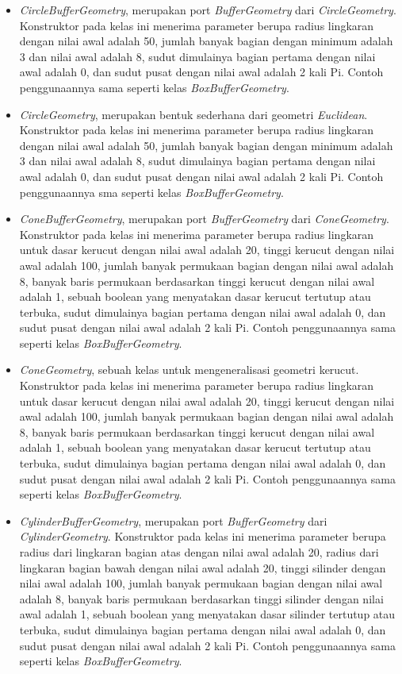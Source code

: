 \begin{itemize}
\begin{itemize}
	\item {\it CircleBufferGeometry}, merupakan port {\it BufferGeometry} dari {\it CircleGeometry}. Konstruktor pada kelas ini menerima parameter berupa radius lingkaran dengan nilai awal adalah 50, jumlah banyak bagian dengan minimum adalah 3 dan nilai awal adalah 8, sudut dimulainya bagian pertama dengan nilai awal adalah 0, dan sudut pusat dengan nilai awal adalah 2 kali Pi. Contoh penggunaannya sama seperti kelas {\it BoxBufferGeometry}.

	\item {\it CircleGeometry}, merupakan bentuk sederhana dari geometri {\it Euclidean}. Konstruktor pada kelas ini menerima parameter berupa radius lingkaran dengan nilai awal adalah 50, jumlah banyak bagian dengan minimum adalah 3 dan nilai awal adalah 8, sudut dimulainya bagian pertama dengan nilai awal adalah 0, dan sudut pusat dengan nilai awal adalah 2 kali Pi. Contoh penggunaannya sma seperti kelas {\it BoxBufferGeometry}.
	
	\item {\it ConeBufferGeometry}, merupakan port {\it BufferGeometry} dari {\it ConeGeometry}. Konstruktor pada kelas ini menerima parameter berupa radius lingkaran untuk dasar kerucut dengan nilai awal adalah 20, tinggi kerucut dengan nilai awal adalah 100, jumlah banyak permukaan bagian dengan nilai awal adalah 8, banyak baris permukaan berdasarkan tinggi kerucut dengan nilai awal adalah 1, sebuah boolean yang menyatakan dasar kerucut tertutup atau terbuka, sudut dimulainya bagian pertama dengan nilai awal adalah 0, dan sudut pusat dengan nilai awal adalah 2 kali Pi. Contoh penggunaannya sama seperti kelas {\it BoxBufferGeometry}.
	
	\item {\it ConeGeometry}, sebuah kelas untuk mengeneralisasi geometri kerucut. Konstruktor pada kelas ini menerima parameter berupa radius lingkaran untuk dasar kerucut dengan nilai awal adalah 20, tinggi kerucut dengan nilai awal adalah 100, jumlah banyak permukaan bagian dengan nilai awal adalah 8, banyak baris permukaan berdasarkan tinggi kerucut dengan nilai awal adalah 1, sebuah boolean yang menyatakan dasar kerucut tertutup atau terbuka, sudut dimulainya bagian pertama dengan nilai awal adalah 0, dan sudut pusat dengan nilai awal adalah 2 kali Pi. Contoh penggunaannya sama seperti kelas {\it BoxBufferGeometry}.
	
	\item {\it CylinderBufferGeometry}, merupakan port {\it BufferGeometry} dari {\it CylinderGeometry}. Konstruktor pada kelas ini menerima parameter berupa radius dari lingkaran bagian atas dengan nilai awal adalah 20, radius dari lingkaran bagian bawah dengan nilai awal adalah 20, tinggi silinder dengan nilai awal adalah 100, jumlah banyak permukaan bagian dengan nilai awal adalah 8, banyak baris permukaan berdasarkan tinggi silinder dengan nilai awal adalah 1, sebuah boolean yang menyatakan dasar silinder tertutup atau terbuka, sudut dimulainya bagian pertama dengan nilai awal adalah 0, dan sudut pusat dengan nilai awal adalah 2 kali Pi. Contoh penggunaannya sama seperti kelas {\it BoxBufferGeometry}.
	

\end{itemize}
\end{itemize}
